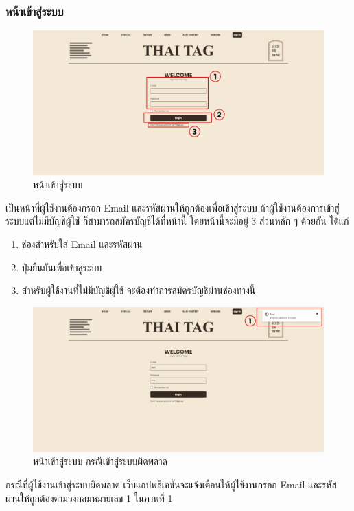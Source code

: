 \documentclass[12pt,oneside,openright,a4paper]{cpe-thai-project}
\begin{document}
\begin{itemize}
        \subsubsection{หน้าเข้าสู่ระบบ}
          \begin{figure}[!ht]\centering
            \includegraphics[width=\textwidth]{./img/project_ui/4_2.png}
            \caption{หน้าเข้าสู่ระบบ}\label{fig:exp_signin}
          \end{figure}
          \hspace{1cm}เป็นหน้าที่ผู้ใช้งานต้องกรอก Email และรหัสผ่านให้ถูกต้องเพื่อเข้าสู่ระบบ ถ้าผู้ใช้งานต้องการเข้าสู่ระบบแต่ไม่มีบัญชีผู้ใช้
          ก็สามารถสมัครบัญชีได้ที่หน้านี้ โดยหน้านี้จะมีอยู่ 3 ส่วนหลัก ๆ ด้วยกัน ได้แก่
          \begin{enumerate}
            \item ช่องสำหรับใส่ Email และรหัสผ่าน
            \item ปุ่มยืนยันเพื่อเข้าสู่ระบบ
            \item สำหรับผู้ใช้งานที่ไม่มีบัญชีผู้ใช้ จะต้องทำการสมัครบัญชีผ่านช่องทางนี้
          \end{enumerate}
          \begin{figure}[!ht]\centering
            \includegraphics[width=\textwidth]{./img/project_ui/4_3.png}
            \caption{หน้าเข้าสู่ระบบ กรณีเข้าสู่ระบบผิดพลาด}\label{fig:exp_signin_wrong}
          \end{figure}
          \hspace{1cm}กรณีที่ผู้ใช้งานเข้าสู่ระบบผิดพลาด เว็บแอปพลิเคชันจะแจ้งเตือนให้ผู้ใช้งานกรอก Email และรหัสผ่านให้ถูกต้องตามวงกลมหมายเลข 1 
          ในภาพที่ \ref{fig:exp_signin}


\end{itemize}
\end{document}
